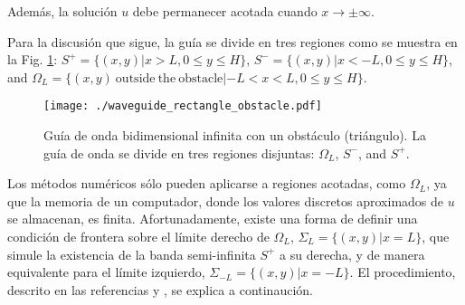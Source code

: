 \documentclass[11pt]{article}
\begin{document}
Además, la solución $u$ debe permanecer acotada cuando $x \rightarrow \pm\infty$.

Para la discusión que sigue, la guía se divide en tres regiones como se muestra en la Fig. \ref{fig:waveguide}: $S^+ = \{(x,y)| x > L,  0 \le y \le H\}$, $S^- = \{(x,y)| x < -L,  0 \le y \le H\}$, and $\Omega_L = \{(x,y)~\mathrm{outside}~\mathrm{the}~\mathrm{obstacle}| -L < x < L, 0 \le y \le H\}$.
\begin{figure}[h]
  \centering
  \texttt{[image: ./waveguide\_rectangle\_obstacle.pdf]}
  \caption{Guía de onda bidimensional infinita con un obstáculo (triángulo).
La guía de onda se divide en tres regiones disjuntas: $\Omega_L$, $S^-$, and $S^+$.}
  \label{fig:waveguide}
\end{figure}

Los métodos numéricos sólo pueden aplicarse a regiones acotadas, como $\Omega_L$, ya que la memoria de un computador, donde los valores discretos aproximados de $u$ se almacenan, es finita. Afortunadamente, existe una forma de definir una condición de frontera sobre el límite derecho de $\Omega_L$, $\Sigma_L = \{(x,y)|x=L\}$, que simule la existencia de la banda semi-infinita  $S^+$ a su derecha, y de manera equivalente para el límite izquierdo, $\Sigma_{-L} = \{(x,y)|x=-L\}$. El procedimiento, descrito en las referencias  \cite{ihlenburg1998finite} y \cite{chesnel2025tutorial}, se explica a continaución.
\end{document}
